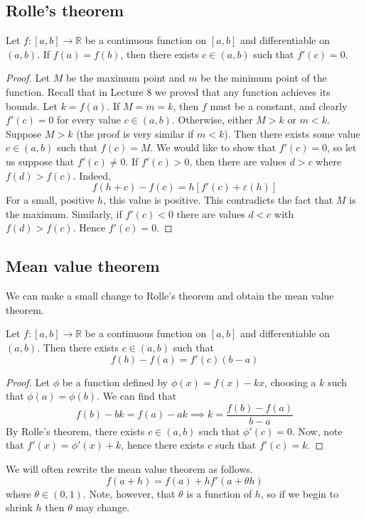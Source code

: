 \subsection{Rolle's theorem}
\begin{theorem}
	Let \(f \colon [a,b] \to \mathbb R\) be a continuous function on \([a,b]\) and differentiable on \((a, b)\).
	If \(f(a) = f(b)\), then there exists \(c \in (a,b)\) such that \(f'(c) = 0\).
\end{theorem}
\begin{proof}
	Let \(M\) be the maximum point and \(m\) be the minimum point of the function.
	Recall that in Lecture 8 we proved that any function achieves its bounds.
	Let \(k = f(a)\).
	If \(M=m=k\), then \(f\) must be a constant, and clearly \(f'(c) = 0\) for every value \(c \in (a, b)\).
	Otherwise, either \(M > k\) or \(m < k\).
	Suppose \(M > k\) (the proof is very similar if \(m < k\)).
	Then there exists some value \(c \in (a, b)\) such that \(f(c) = M\).
	We would like to show that \(f'(c) = 0\), so let us suppose that \(f'(c) \neq 0\).
	If \(f'(c) > 0\), then there are values \(d > c\) where \(f(d) > f(c)\).
	Indeed,
	\[
		f(h+c) - f(c) = h\left[ f'(c) + \varepsilon(h) \right]
	\]
	For a small, positive \(h\), this value is positive.
	This contradicts the fact that \(M\) is the maximum.
	Similarly, if \(f'(c) < 0\) there are values \(d < c\) with \(f(d) > f(c)\).
	Hence \(f'(c) = 0\).
\end{proof}

\subsection{Mean value theorem}
We can make a small change to Rolle's theorem and obtain the mean value theorem.
\begin{theorem}
	Let \(f \colon [a,b] \to \mathbb R\) be a continuous function on \([a,b]\) and differentiable on \((a, b)\).
	Then there exists \(c \in (a, b)\) such that
	\[
		f(b) - f(a) = f'(c)(b-a)
	\]
\end{theorem}
\begin{proof}
	Let \(\phi\) be a function defined by \(\phi(x) = f(x) - kx\), choosing a \(k\) such that \(\phi(a) = \phi(b)\).
	We can find that
	\[
		f(b) - bk = f(a) - ak \implies k = \frac{f(b) - f(a)}{b - a}
	\]
	By Rolle's theorem, there exists \(c \in (a,b)\) such that \(\phi'(c) = 0\).
	Now, note that \(f'(x) = \phi'(x) + k\), hence there exists \(c\) such that \(f'(c) = k\).
\end{proof}
\begin{remark}
	We will often rewrite the mean value theorem as follows.
	\[
		f(a + h) = f(a) + hf'(a + \theta h)
	\]
	where \(\theta \in (0, 1)\).
	Note, however, that \(\theta\) is a function of \(h\), so if we begin to shrink \(h\) then \(\theta\) may change.
\end{remark}

